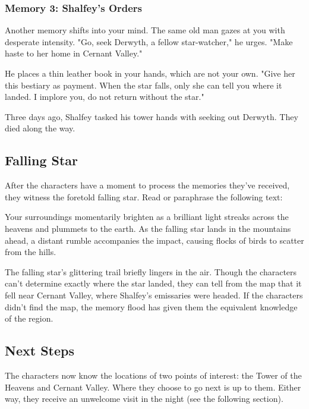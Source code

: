 \documentclass[10pt,a4paper,twoside,bg=print,twocolumn,openany,nodeprecatedcode]{dndbook}
\begin{document}
\subsubsection{Memory 3: Shalfey's Orders}
\begin{DndReadAloud}{}
Another memory shifts into your mind. The same old man gazes at you with desperate intensity. "Go, seek Derwyth, a fellow star-watcher," he urges. "Make haste to her home in Cernant Valley."

He places a thin leather book in your hands, which are not your own. "Give her this bestiary as payment. When the star falls, only she can tell you where it landed. I implore you, do not return without the star."

\end{DndReadAloud}

Three days ago, Shalfey tasked his tower hands with seeking out Derwyth. They died along the way.

\subsection{Falling Star}
After the characters have a moment to process the memories they've received, they witness the foretold falling star. Read or paraphrase the following text:

\begin{DndReadAloud}{}
Your surroundings momentarily brighten as a brilliant light streaks across the heavens and plummets to the earth. As the falling star lands in the mountains ahead, a distant rumble accompanies the impact, causing flocks of birds to scatter from the hills.

\end{DndReadAloud}

The falling star's glittering trail briefly lingers in the air. Though the characters can't determine exactly where the star landed, they can tell from the map that it fell near Cernant Valley, where Shalfey's emissaries were headed. If the characters didn't find the map, the memory flood has given them the equivalent knowledge of the region.

\subsection{Next Steps}
The characters now know the locations of two points of interest: the Tower of the Heavens and Cernant Valley. Where they choose to go next is up to them. Either way, they receive an unwelcome visit in the night (see the following section).
\end{document}
